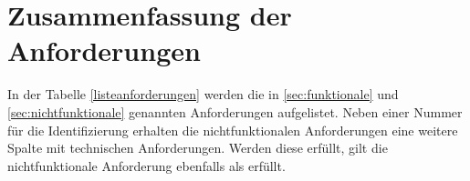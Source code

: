 \section{Zusammenfassung der Anforderungen} %
\label{sec:uebersichtanfoderungen}
In der Tabelle \ref{listeanforderungen} werden die in \ref{sec:funktionale} und \ref{sec:nichtfunktionale} genannten Anforderungen aufgelistet.
Neben einer Nummer für die Identifizierung erhalten die nichtfunktionalen Anforderungen eine weitere Spalte mit technischen Anforderungen. Werden diese erfüllt, gilt die nichtfunktionale Anforderung ebenfalls als erfüllt.


